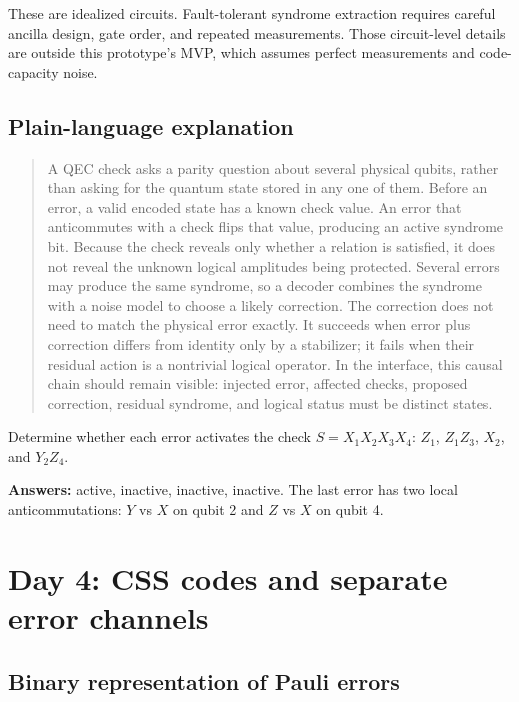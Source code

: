 \documentclass[11pt]{article}
\begin{document}
These are idealized circuits. Fault-tolerant syndrome extraction requires careful ancilla design,
gate order, and repeated measurements. Those circuit-level details are outside this prototype's MVP,
which assumes perfect measurements and code-capacity noise.

\subsection{Plain-language explanation}

\begin{quote}\small
A QEC check asks a parity question about several physical qubits, rather than asking for the quantum
state stored in any one of them. Before an error, a valid encoded state has a known check value. An
error that anticommutes with a check flips that value, producing an active syndrome bit. Because the
check reveals only whether a relation is satisfied, it does not reveal the unknown logical amplitudes
being protected. Several errors may produce the same syndrome, so a decoder combines the syndrome
with a noise model to choose a likely correction. The correction does not need to match the physical
error exactly. It succeeds when error plus correction differs from identity only by a stabilizer; it
fails when their residual action is a nontrivial logical operator. In the interface, this causal chain
should remain visible: injected error, affected checks, proposed correction, residual syndrome, and
logical status must be distinct states.
\end{quote}

\begin{masterybox}[title={Day 3 exercises}]
Determine whether each error activates the check \(S=X_1X_2X_3X_4\):
\(Z_1\), \(Z_1Z_3\), \(X_2\), and \(Y_2Z_4\).

\textbf{Answers:} active, inactive, inactive, inactive. The last error has two local
anticommutations: \(Y\) vs \(X\) on qubit 2 and \(Z\) vs \(X\) on qubit 4.
\end{masterybox}

\section{Day 4: CSS codes and separate error channels}

\subsection{Binary representation of Pauli errors}
\end{document}
